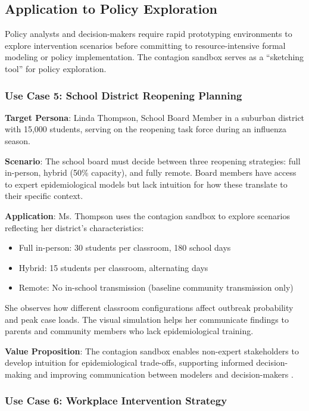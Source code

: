 \subsection{Application to Policy Exploration}

Policy analysts and decision-makers require rapid prototyping environments to explore intervention scenarios before committing to resource-intensive formal modeling or policy implementation. The contagion sandbox serves as a ``sketching tool'' for policy exploration.

\subsubsection{Use Case 5: School District Reopening Planning}

\textbf{Target Persona}: Linda Thompson, School Board Member in a suburban district with 15,000 students, serving on the reopening task force during an influenza season.

\textbf{Scenario}: The school board must decide between three reopening strategies: full in-person, hybrid (50\% capacity), and fully remote. Board members have access to expert epidemiological models but lack intuition for how these translate to their specific context.

\textbf{Application}: Ms. Thompson uses the contagion sandbox to explore scenarios reflecting her district's characteristics:
\begin{itemize}
    \item Full in-person: 30 students per classroom, 180 school days
    \item Hybrid: 15 students per classroom, alternating days
    \item Remote: No in-school transmission (baseline community transmission only)
\end{itemize}

She observes how different classroom configurations affect outbreak probability and peak case loads. The visual simulation helps her communicate findings to parents and community members who lack epidemiological training.

\textbf{Value Proposition}: The contagion sandbox enables non-expert stakeholders to develop intuition for epidemiological trade-offs, supporting informed decision-making and improving communication between modelers and decision-makers \cite{saltelli2020five}.

\subsubsection{Use Case 6: Workplace Intervention Strategy}

